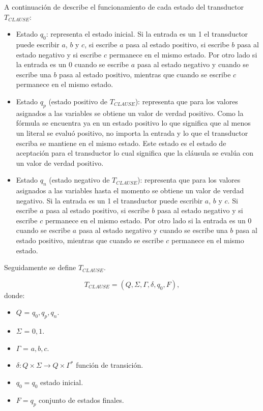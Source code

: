 A continuación de describe el funcionamiento de cada estado del transductor $T_{CLAUSE}$:
\begin{itemize}
    \item Estado $q_0$: representa el estado inicial. Si la entrada es un 1 el transductor puede escribir $a$,
          $b$ y $c$, si escribe $a$ pasa al estado positivo, si escribe $b$ pasa al estado negativo y si escribe $c$
          permanece en el mismo estado. Por otro lado si la entrada es un 0 cuando se escribe $a$ pasa al estado
          negativo y cuando se escribe una $b$ pasa al estado positivo, mientras que cuando se escribe $c$
          permanece en el mismo estado.

    \item Estado $q_p$ (estado positivo de $T_{CLAUSE}$): representa que para los valores asignados a las
          variables se obtiene un valor de verdad positivo.  Como la fórmula se encuentra ya en un estado positivo
          lo que significa que al menos un literal se evaluó positivo, no importa la entrada y lo que el transductor
          escriba se mantiene en el mismo estado. Este estado es el estado de aceptación para el transductor lo cual
          significa que la cláusula se evalúa con un valor de verdad positivo.

    \item Estado $q_n$ (estado negativo de $T_{CLAUSE}$): representa que para los valores asignados a las variables
          hasta el momento se obtiene un valor de verdad negativo. Si la entrada es un 1 el transductor puede
          escribir $a$, $b$ y $c$. Si escribe $a$ pasa al estado positivo, si escribe $b$ pasa al estado negativo y
          si escribe $c$ permanece en el mismo estado. Por otro lado si la entrada es un 0 cuando se escribe $a$ pasa
          al estado negativo y cuando se escribe una $b$ pasa al estado positivo, mientras que cuando se escribe $c$
          permanece en el mismo estado.

\end{itemize}

Seguidamente se define $T_{CLAUSE}$.

\[
    T_{CLAUSE} = (Q, {\Sigma}, \Gamma, \delta, q_{0}, F),
\]
donde:
\begin{itemize}
    \item \(Q\) = ${q_0,q_p,q_n}$.
    \item \(\Sigma\) = ${0,1}$.
    \item \(\Gamma\) = ${a,b,c}$.
    \item \(\delta: Q \times \Sigma \to Q \times \Gamma^*\) función de transición.
    \item \(q_{0} = q_0\) estado inicial.
    \item \(F={q_p}\) conjunto de estados finales.
\end{itemize}

